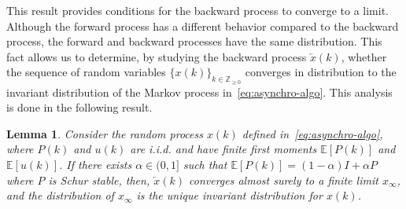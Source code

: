 \documentclass{IEEEtran}
\newtheorem{lemma}{Lemma}
\newcommand{\integernonnegative}{\mathbb{Z}_{\ge 0}}
\def\Exp{\mathbb{E}}
\newcommand{\1}{\mathbf{1}} \newcommand{\ind}{\mathds{1}}
\begin{document}
This result provides conditions for the backward process to converge to a limit. Although the forward process has a different behavior compared to the backward process, the forward and backward processes have the same distribution. This fact allows us to determine, by studying the backward process $\overleftarrow{x}(k)$, whether the sequence of random variables $\{x(k)\}_{k\in\integernonnegative}$ converges in distribution to the invariant distribution of the Markov { {process}} in~\eqref{eq:asynchro-algo}.
This analysis is done in the following result.
\begin{lemma}\label{lem:back_convergence}
Consider the random process $x(k)$ defined in~\eqref{eq:asynchro-algo}, where $P(k)$ and $u(k)$ are i.i.d. and have finite first moments $\Exp[P(k)]$ and $\Exp[u(k)]$. If there exists $\alpha\in(0,1]$ such that 
$\Exp[P(k)]=(1-\alpha)I+\alpha P$ where $P$ is Schur stable, then, 
$\overleftarrow{x}(k)$ converges almost surely to a finite limit $x_{\infty}$, and the distribution of $x_{\infty}$ is the unique invariant distribution for $x(k)$.
\end{lemma}
\end{document}
